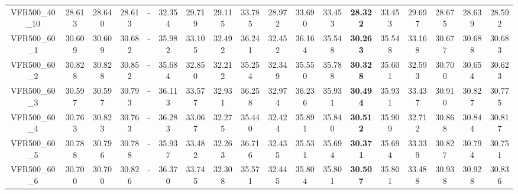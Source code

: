 \begin{tabular}{cc|ccc|ccccccccccccc}
VFR500\_40\_10     & 28.613           & 28.640           & 28.613           & -                & 32.354           & 29.719           & 29.115           & 33.785           & 28.972           & 33.690           & 33.453           & {\bf 28.322}     & 33.453           & 29.697           & 28.675           & 28.639           & 28.592          \\ 
VFR500\_60\_1      & 30.609           & 30.609           & 30.682           & -                & 35.982           & 33.105           & 32.492           & 36.241           & 32.452           & 36.164           & 35.548           & {\bf 30.263}     & 35.548           & 33.168           & 30.677           & 30.688           & 30.683          \\ 
VFR500\_60\_2      & 30.828           & 30.828           & 30.852           & -                & 35.684           & 32.850           & 32.212           & 35.254           & 32.349           & 35.550           & 35.788           & {\bf 30.328}     & 35.601           & 32.593           & 30.700           & 30.654           & 30.623          \\ 
VFR500\_60\_3      & 30.597           & 30.597           & 30.793           & -                & 36.113           & 33.577           & 32.931           & 36.258           & 32.974           & 36.236           & 35.931           & {\bf 30.494}     & 35.931           & 33.437           & 30.910           & 30.827           & 30.775          \\ 
VFR500\_60\_4      & 30.763           & 30.823           & 30.763           & -                & 36.283           & 33.067           & 32.275           & 35.440           & 32.424           & 35.891           & 35.840           & {\bf 30.512}     & 35.909           & 32.712           & 30.868           & 30.844           & 30.817          \\ 
VFR500\_60\_5      & 30.788           & 30.796           & 30.788           & -                & 35.937           & 33.482           & 32.263           & 36.716           & 32.435           & 35.531           & 35.694           & {\bf 30.371}     & 35.694           & 33.339           & 30.827           & 30.794           & 30.751          \\ 
VFR500\_60\_6      & 30.700           & 30.700           & 30.826           & -                & 36.370           & 33.745           & 32.308           & 35.571           & 32.445           & 35.804           & 35.801           & {\bf 30.507}     & 35.801           & 33.488           & 30.938           & 30.928           & 30.836          \\ 

\end{tabular}
